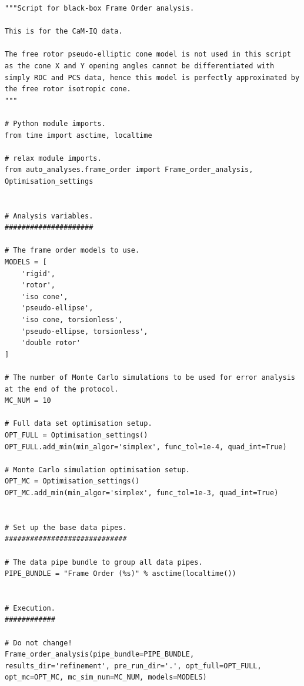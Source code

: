 \begin{lstlisting}
"""Script for black-box Frame Order analysis.

This is for the CaM-IQ data.

The free rotor pseudo-elliptic cone model is not used in this script as the cone X and Y opening angles cannot be differentiated with simply RDC and PCS data, hence this model is perfectly approximated by the free rotor isotropic cone.
"""

# Python module imports.
from time import asctime, localtime

# relax module imports.
from auto_analyses.frame_order import Frame_order_analysis, Optimisation_settings


# Analysis variables.
#####################

# The frame order models to use.
MODELS = [
    'rigid',
    'rotor',
    'iso cone',
    'pseudo-ellipse',
    'iso cone, torsionless',
    'pseudo-ellipse, torsionless',
    'double rotor'
]

# The number of Monte Carlo simulations to be used for error analysis at the end of the protocol.
MC_NUM = 10

# Full data set optimisation setup.
OPT_FULL = Optimisation_settings()
OPT_FULL.add_min(min_algor='simplex', func_tol=1e-4, quad_int=True)

# Monte Carlo simulation optimisation setup.
OPT_MC = Optimisation_settings()
OPT_MC.add_min(min_algor='simplex', func_tol=1e-3, quad_int=True)


# Set up the base data pipes.
#############################

# The data pipe bundle to group all data pipes.
PIPE_BUNDLE = "Frame Order (%s)" % asctime(localtime())


# Execution.
############

# Do not change!
Frame_order_analysis(pipe_bundle=PIPE_BUNDLE, results_dir='refinement', pre_run_dir='.', opt_full=OPT_FULL, opt_mc=OPT_MC, mc_sim_num=MC_NUM, models=MODELS)
\end{lstlisting}
